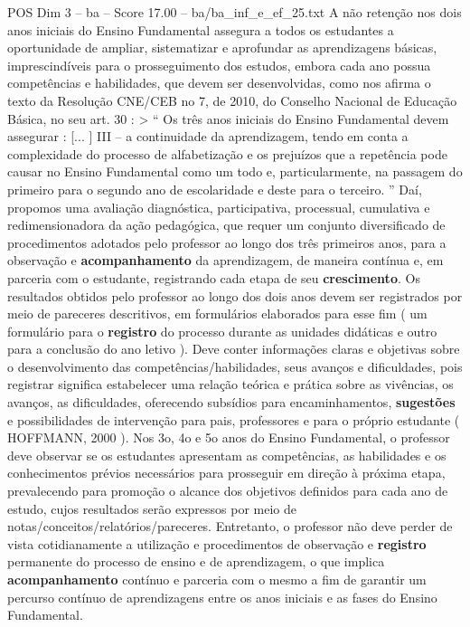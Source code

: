 \begin{textsample}{POS Dim 3 – ba – Score 17.00 – ba/ba\_inf\_e\_ef\_25.txt}
A não retenção nos dois anos iniciais do Ensino Fundamental assegura a todos os estudantes a oportunidade de ampliar, sistematizar e aprofundar as aprendizagens básicas, imprescindíveis para o prosseguimento dos estudos, embora cada ano possua competências e habilidades, que devem ser desenvolvidas, como nos afirma o texto da Resolução CNE/CEB no 7, de 2010, do Conselho Nacional de Educação Básica, no seu art. 30 : > “ Os três anos iniciais do Ensino Fundamental devem assegurar : [... ] III – a continuidade da aprendizagem, tendo em conta a complexidade do processo de alfabetização e os prejuízos que a repetência pode causar no Ensino Fundamental como um todo e, particularmente, na passagem do primeiro para o segundo ano de escolaridade e deste para o terceiro. ” Daí, propomos uma avaliação diagnóstica, participativa, processual, cumulativa e redimensionadora da ação pedagógica, que requer um conjunto diversificado de procedimentos adotados pelo professor ao longo dos três primeiros anos, para a observação e \textbf{acompanhamento} da aprendizagem, de maneira contínua e, em parceria com o estudante, registrando cada etapa de seu \textbf{crescimento}.
Os resultados obtidos pelo professor ao longo dos dois anos devem ser registrados por meio de pareceres descritivos, em formulários elaborados para esse fim ( um formulário para o \textbf{registro} do processo durante as unidades didáticas e outro para a conclusão do ano letivo ).
Deve conter informações claras e objetivas sobre o desenvolvimento das competências/habilidades, seus avanços e dificuldades, pois registrar significa estabelecer uma relação teórica e prática sobre as vivências, os avanços, as dificuldades, oferecendo subsídios para encaminhamentos, \textbf{sugestões} e possibilidades de intervenção para pais, professores e para o próprio estudante ( HOFFMANN, 2000 ).
Nos 3o, 4o e 5o anos do Ensino Fundamental, o professor deve observar se os estudantes apresentam as competências, as habilidades e os conhecimentos prévios necessários para prosseguir em direção à próxima etapa, prevalecendo para promoção o alcance dos objetivos definidos para cada ano de estudo, cujos resultados serão expressos por meio de notas/conceitos/relatórios/pareceres.
Entretanto, o professor não deve perder de vista cotidianamente a utilização e procedimentos de observação e \textbf{registro} permanente do processo de ensino e de aprendizagem, o que implica \textbf{acompanhamento} contínuo e parceria com o mesmo a fim de garantir um percurso contínuo de aprendizagens entre os anos iniciais e as fases do Ensino Fundamental.

\end{textsample}
